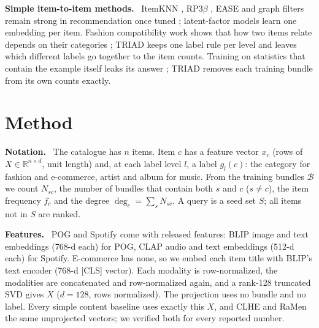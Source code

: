 \documentclass[runningheads]{llncs}
\newcommand{\R}{\mathbb{R}}
\newcommand{\B}{\mathcal{B}}
\renewcommand{\paragraph}[1]{\smallskip\noindent\textbf{#1}\ }
\begin{document}
\paragraph{Simple item-to-item methods.} ItemKNN \cite{sarwar2001}, RP3$\beta$ \cite{rp3beta}, EASE \cite{steck2019}
and graph filters \cite{gfcf,sgfcf} remain strong in recommendation once tuned \cite{dacrema,rendle2020}; latent-factor
models \cite{hu2008,bpr,lightgcn} learn one embedding per item. Fashion compatibility work shows that how two items
relate depends on their categories \cite{han2017,vasileva2018,mcauley}; TRIAD keeps one label rule per level and leaves
which different labels go together to the item counts. Training on statistics that contain the example itself leaks
its answer \cite{kapoor2023}; TRIAD removes each training bundle from its own counts exactly.

\section{Method}
\label{sec:method}

\paragraph{Notation.} The catalogue has $n$ items. Item $c$ has a feature vector $x_c$ (rows of $X\in\R^{n\times d}$,
unit length) and, at each label level $l$, a label $g_l(c)$: the category for fashion and e-commerce, artist and album
for music. From the training bundles $\B$ we count $N_{sc}$, the number of bundles that contain both $s$ and $c$
($s\neq c$), the item frequency $f_c$ and the degree $\deg_c=\sum_s N_{sc}$. A query is a seed set $S$; all items not
in $S$ are ranked.

\paragraph{Features.} POG and Spotify come with released features: BLIP \cite{blip} image and text embeddings (768-d
each) for POG, CLAP \cite{clap} audio and text embeddings (512-d each) for Spotify. E-commerce has none, so we embed each
item title with BLIP's text encoder (768-d [CLS] vector). Each modality is row-normalized, the modalities are
concatenated and row-normalized again, and a rank-128 truncated SVD gives $X$ ($d=128$, rows normalized). The
projection uses no bundle and no label. Every simple content baseline uses exactly this $X$, and CLHE and RaMen the
same unprojected vectors; we verified both for every reported number.
\end{document}
